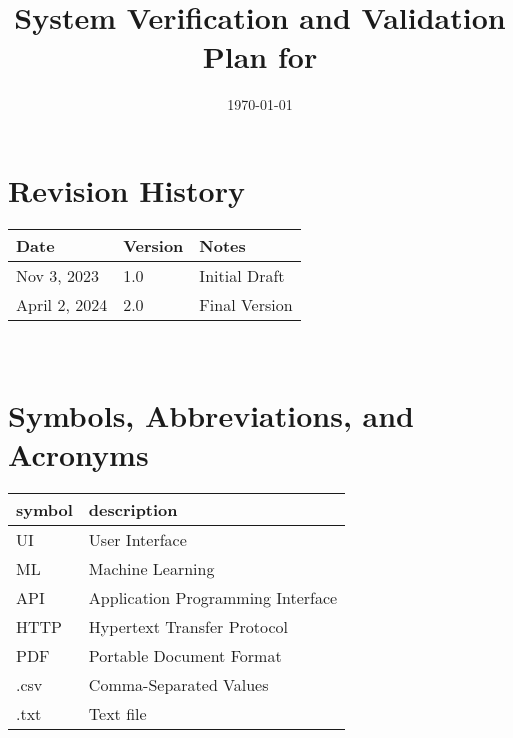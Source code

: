 \documentclass[12pt, titlepage]{article}
\begin{document}
\title{System Verification and Validation Plan for \progname{}} 
\author{\authname}
\date{\today}
	
\maketitle


\section*{Revision History}

\begin{tabularx}{\textwidth}{p{3cm}p{2cm}X}
\toprule {\bf Date} & {\bf Version} & {\bf Notes}\\
\midrule
Nov 3, 2023 & 1.0 & Initial Draft\\
April 2, 2024 & 2.0 & Final Version\\
\bottomrule
\end{tabularx}

~\\

\newpage

\tableofcontents

\listoftables


\newpage

\section{Symbols, Abbreviations, and Acronyms}

\renewcommand{\arraystretch}{1.2}
\begin{tabular}{l l} 
  \toprule		
  \textbf{symbol} & \textbf{description}\\
  \midrule 
      UI & User Interface \\
      ML & Machine Learning\\
      API & Application Programming Interface\\
      HTTP & Hypertext Transfer Protocol\\
      PDF & Portable Document Format\\
      .csv & Comma-Separated Values \\
      .txt & Text file\\
  \bottomrule
  
\end{tabular}\\


\newpage
\end{document}
